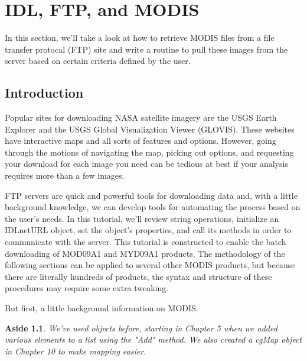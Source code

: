 \documentclass{book}
\theoremstyle{aside_style}
\newtheorem*{myaside}{Aside}
\newenvironment{aside}
	{\par\noindent\hrulefill\begin{myaside}}
	{\par\noindent\hrulefill\end{myaside}}
\begin{document}
\setcounter{chapter}{16} %
\chapter{IDL, FTP, and MODIS}

In this section, we'll take a look at how to retrieve MODIS files from a file transfer protocal (FTP) site and 
write a routine to pull these images from the server based on certain criteria defined by the user. 

\section{Introduction}
Popular sites for downloading NASA satellite imagery are the USGS Earth Explorer and the USGS Global Visualization Viewer (GLOVIS).
These websites have interactive maps and all sorts of features and options. However, going through the motions of navigating the map,
picking out options, and requesting your download for each image you need can be tedious at best if your analysis requires more than a few
images.

FTP servers are quick and powerful tools for downloading data and, with a little background knowledge,
we can develop tools for automating the process based on the user's needs. In this tutorial, we'll review string operations, 
initialize an IDLnetURL object, set the object's properties, and call its methods in order to communicate with the server. 
This tutorial is constructed to enable the batch downloading of MOD09A1 and MYD09A1 products. 
The methodology of the following sections can be applied to several other MODIS products, 
but because there are literally hundreds of products, the syntax and structure of these procedures may require some extra tweaking.


But first, a little background information on MODIS.



\begin{aside}
We've used objects before, starting in Chapter 5 when we added various elements to a list using the "Add" method. 
We also created a cgMap object in Chapter 10 to make mapping easier.
\end{aside}





\pagebreak
\end{document}
